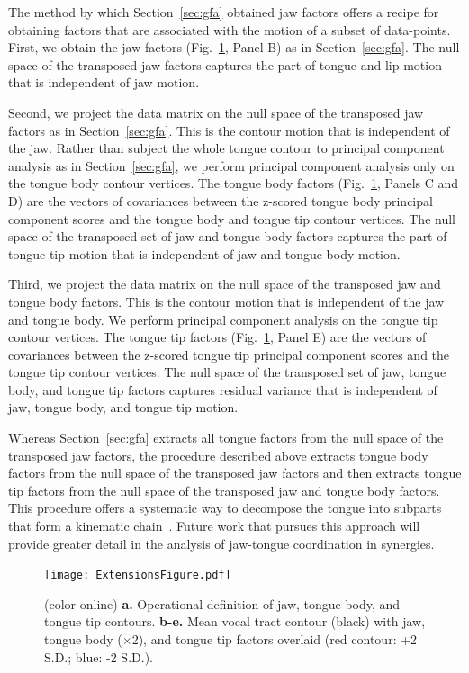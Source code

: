 \documentclass[preprint]{JASAnew}\usepackage[]{graphicx}\usepackage[]{color}
\begin{document}
The method by which Section~\ref{sec:gfa} obtained jaw factors offers a recipe for obtaining factors that are associated with the motion of a subset of data-points. 
First, we obtain the jaw factors (Fig.~\ref{fig:extensionsfigure}, Panel B) as in Section~\ref{sec:gfa}.
The null space of the transposed jaw factors captures the part of tongue and lip motion that is independent of jaw motion. 

Second, we project the data matrix on the null space of the transposed jaw factors as in Section~\ref{sec:gfa}. This is the contour motion that is independent of the jaw.
Rather than subject the whole tongue contour to principal component analysis as in Section~\ref{sec:gfa}, we perform principal component analysis only on the tongue body contour vertices.
The tongue body factors (Fig.~\ref{fig:extensionsfigure}, Panels C and D) are the vectors of covariances between the z-scored tongue body principal component scores and the tongue body and tongue tip contour vertices.
The null space of the transposed set of jaw and tongue body factors captures the part of tongue tip motion that is independent of jaw and tongue body motion.

Third, we project the data matrix on the null space of the transposed jaw and tongue body factors. This is the contour motion that is independent of the jaw and tongue body.
We perform principal component analysis on the tongue tip contour vertices.
The tongue tip factors (Fig.~\ref{fig:extensionsfigure}, Panel E) are the vectors of covariances between the z-scored tongue tip principal component scores and the tongue tip contour vertices.
The null space of the transposed set of jaw, tongue body, and tongue tip factors captures residual variance that is independent of jaw, tongue body, and tongue tip motion.

Whereas Section~\ref{sec:gfa} extracts all tongue factors from the null space of the transposed jaw factors, the procedure described above extracts tongue body factors from the null space of the transposed jaw factors and then extracts tongue tip factors from the null space of the transposed jaw and tongue body factors.
This procedure offers a systematic way to decompose the tongue into subparts that form a kinematic chain~\cite{craig2005introduction}. Future work that pursues this approach will provide greater detail in the analysis of jaw-tongue coordination in synergies.

\begin{figure}

\texttt{[image: ExtensionsFigure.pdf]}

\caption{(color online) {\bf a.} Operational definition of jaw, tongue body, and tongue tip contours.
{\bf b-e.} Mean vocal tract contour (black) with jaw, tongue body ($\times$\num{2}), and tongue tip factors overlaid (red contour: +\num{2} S.D.; blue: -\num{2} S.D.).}
\label{fig:extensionsfigure}
\end{figure}
\end{document}
